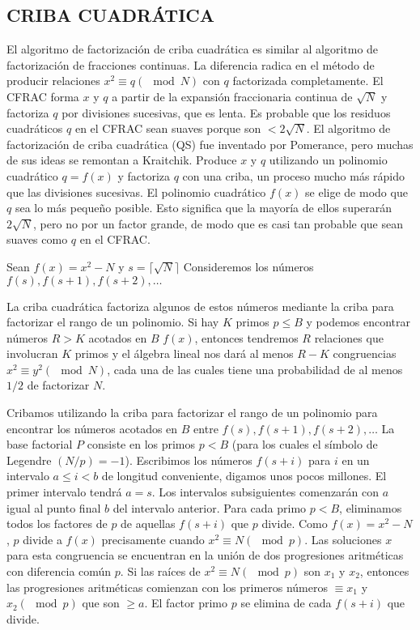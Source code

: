         \subsection{CRIBA CUADRÁTICA}
        El algoritmo de factorización de criba cuadrática es similar al algoritmo de factorización de fracciones continuas. La diferencia radica en el método de producir relaciones $x^2 \equiv q(\mod N)$ con $q$ factorizada completamente. El CFRAC forma $x$ y $q$ a partir de la expansión fraccionaria continua de $\sqrt{N}$ y factoriza $q$ por divisiones sucesivas, que es lenta. Es probable que los residuos cuadráticos $q$ en el CFRAC sean suaves porque son $< 2\sqrt{N}$.
        El algoritmo de factorización de criba cuadrática (QS) fue inventado por Pomerance, pero muchas de sus ideas se remontan a Kraitchik. Produce $x$ y $q$ utilizando un polinomio cuadrático $q = f(x)$ y factoriza $q$ con una criba, un proceso mucho más rápido que las divisiones sucesivas. El polinomio cuadrático $f(x)$ se elige de modo que $q$ sea lo más pequeño posible. Esto significa que la mayoría de ellos superarán $2\sqrt{N}$, pero no por un factor grande, de modo que es casi tan probable que sean suaves como $q$ en el CFRAC.

        Sean $f(x) = x^2 - N$ y $s=\lceil\sqrt{N}\rceil$ Consideremos los números $f(s), f(s+1), f(s+2), \dots$

        La criba cuadrática factoriza algunos de estos números mediante la criba para factorizar el rango de un polinomio. Si hay $K$ primos $p \leq B$ y podemos encontrar números $R > K$ acotados en $B$ $f(x)$, entonces tendremos $R$ relaciones que involucran $K$ primos y el álgebra lineal nos dará al menos $R - K$ congruencias $x^2 \equiv y^2 (\mod N)$, cada una de las cuales tiene una probabilidad de al menos $1/2$ de factorizar $N$.

        Cribamos utilizando la criba para factorizar el rango de un polinomio para encontrar los números acotados en $B$ entre $f(s), f(s + 1), f(s + 2),\dots$ La base factorial $P$ consiste en los primos $p<B$ (para los cuales el símbolo de Legendre $(N/p) = -1$). Escribimos los números $f(s + i)$ para $i$ en un intervalo $a \leq i < b$ de longitud conveniente, digamos unos pocos millones. El primer intervalo tendrá $a = s$. Los intervalos subsiguientes comenzarán con $a$ igual al punto final $b$ del intervalo anterior. Para cada primo $p<B$, eliminamos todos los factores de $p$ de aquellas $f(s + i)$ que $p$ divide. Como $f(x) = x^2 - N$, $p$ divide a $f(x)$ precisamente cuando $x^2 \equiv N (\mod p)$. Las soluciones $x$ para esta congruencia se encuentran en la unión de dos progresiones aritméticas con diferencia común $p$. Si las raíces de $x^2 \equiv N (\mod p)$ son $x_1$ y $x_2$, entonces las progresiones aritméticas comienzan con los primeros números $\equiv x_1$ y $x_2 (\mod p)$ que son $\geq a$. El factor primo $p$ se elimina de cada $f(s + i)$ que divide.

